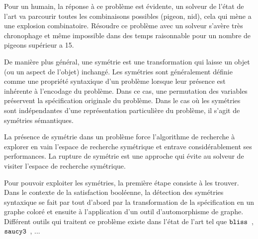 Pour un humain, la réponse à ce problème est évidente, un solveur de l'état de l'art va parcourir toutes 
les combinaisons possibles (pigeon, nid), cela qui mène a une explosion combinatoire.
Résoudre ce problème avec un solveur s'avère très chronophage et même impossible dans des temps raisonnable
pour un nombre de pigeons supérieur a 15.

%
%

De manière plus  général, une symétrie est une transformation qui laisse un objet (ou un aspect de l'objet) inchangé. Les symétries sont généralement définie comme une propriété syntaxique d'un problème lorsque leur présence est inhérente à l'encodage du problème.
Dans ce cas, une permutation des variables préservent la spécification originale du problème.
Dans le cas où les symétries sont indépendantes d'une représentation particulière du problème, il s'agit de symétries sémantiques.

La présence de symétrie dans un problème force l'algorithme de recherche à explorer en vain l'espace de recherche symétrique et entrave considérablement ses performances. La rupture de symétrie est une approche qui évite au solveur de visiter l'espace de recherche symétrique.

Pour pouvoir exploiter les symétries, la première étape consiste à les trouver. Dans le contexte de la satisfaction booléenne, la détection des symétries syntaxique se fait par tout d'abord par la transformation de la spécification en un graphe coloré et ensuite à l'application d'un outil d'automorphisme de graphe.
Différent outils qui traitent ce problème existe dans l'état de l'art tel que $\texttt{bliss}$~\cite{JunttilaKaski:ALENEX2007}, $\texttt{saucy3}$~\cite{katebi2010symmetry}, ...


